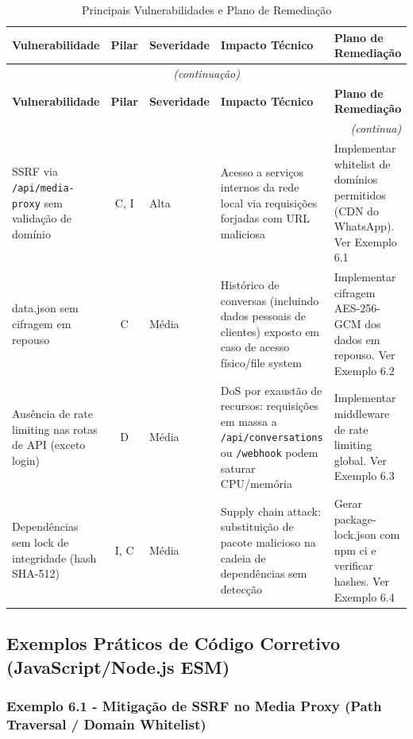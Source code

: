 \documentclass[11pt, a4paper]{article}
\begin{document}
\begin{longtable}{p{4.2cm}cp{1.8cm}p{3.2cm}p{5.8cm}}
\caption{Principais Vulnerabilidades e Plano de Remediação} \\
\toprule
\textbf{Vulnerabilidade} & \textbf{Pilar} & \textbf{Severidade} & \textbf{Impacto Técnico} & \textbf{Plano de Remediação} \\
\midrule
\endfirsthead
\multicolumn{5}{c}{\footnotesize\textit{(continuação)}} \\
\toprule
\textbf{Vulnerabilidade} & \textbf{Pilar} & \textbf{Severidade} & \textbf{Impacto Técnico} & \textbf{Plano de Remediação} \\
\midrule
\endhead
\midrule
\multicolumn{5}{r}{\footnotesize\textit{(continua)}} \\
\endfoot
\bottomrule
\endlastfoot

SSRF via \texttt{/api/media-proxy} sem validação de domínio & C, I & Alta & Acesso a serviços internos da rede local via requisições forjadas com URL maliciosa & Implementar whitelist de domínios permitidos (CDN do WhatsApp). Ver Exemplo 6.1 \\
\midrule
data.json sem cifragem em repouso & C & Média & Histórico de conversas (incluindo dados pessoais de clientes) exposto em caso de acesso físico/file system & Implementar cifragem AES-256-GCM dos dados em repouso. Ver Exemplo 6.2 \\
\midrule
Ausência de rate limiting nas rotas de API (exceto login) & D & Média & DoS por exaustão de recursos: requisições em massa a \texttt{/api/conversations} ou \texttt{/webhook} podem saturar CPU/memória & Implementar middleware de rate limiting global. Ver Exemplo 6.3 \\
\midrule
Dependências sem lock de integridade (hash SHA-512) & I, C & Média & Supply chain attack: substituição de pacote malicioso na cadeia de dependências sem detecção & Gerar package-lock.json com npm ci e verificar hashes. Ver Exemplo 6.4 \\

\end{longtable}

\subsection{Exemplos Práticos de Código Corretivo (JavaScript/Node.js ESM)}

\subsubsection{Exemplo 6.1 - Mitigação de SSRF no Media Proxy (Path Traversal / Domain Whitelist)}
\end{document}
